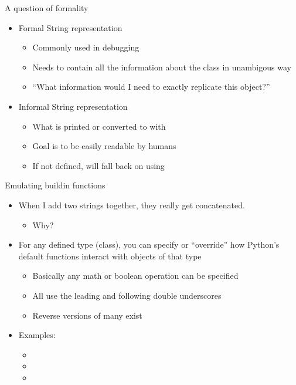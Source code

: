 \documentclass[pdf, aspectratio=169, 12pt]{beamer}
\begin{document}
\begin{frame}{A question of formality}
	\begin{itemize}
		\item Formal String representation
			\begin{itemize}
				\item Commonly used in debugging
				\item Needs to contain all the information about the class in unambigous way
				\item ``What information would I need to exactly replicate this object?''
			\end{itemize}
		\item Informal String representation
			\begin{itemize}
				\item What is printed or converted to with 
				\item Goal is to be easily readable by humans
				\item If not defined,  will fall back on using 
			\end{itemize}
	\end{itemize}
\end{frame}

\begin{frame}{Emulating buildin functions}
	\begin{itemize}
		\item When I add two strings together, they really get concatenated.
			\begin{itemize}
				\item Why?
			\end{itemize}
		\item For any defined type (class), you can specify or ``override'' how Python's default functions interact with objects of that type
			\begin{itemize}
				\item Basically any math or boolean operation can be specified
				\item All use the leading and following double underscores
				\item Reverse versions of many exist
			\end{itemize}
		\item Examples:
			\begin{itemize}
				\item {}
				\item {}
				\item {}
			\end{itemize}
	\end{itemize}
\end{frame}
\end{document}
